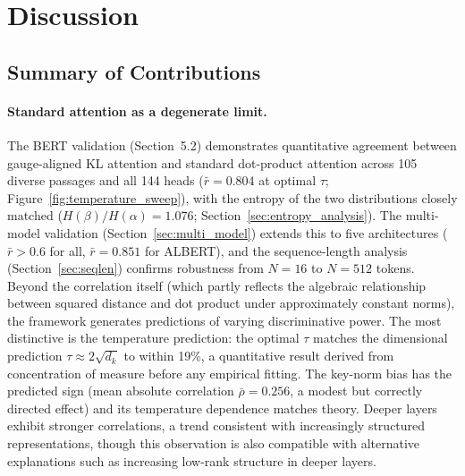 \documentclass[twoside,11pt]{article}
\begin{document}
\section{Discussion}

\subsection{Summary of Contributions}

\paragraph{Standard attention as a degenerate limit.} The BERT validation (Section~5.2) demonstrates quantitative agreement between gauge-aligned KL attention and standard dot-product attention across 105 diverse passages and all 144 heads ($\bar{r} = 0.804$ at optimal $\tau$; Figure~\ref{fig:temperature_sweep}), with the entropy of the two distributions closely matched ($H(\beta)/H(\alpha) = 1.076$; Section~\ref{sec:entropy_analysis}). The multi-model validation (Section~\ref{sec:multi_model}) extends this to five architectures ($\bar{r} > 0.6$ for all, $\bar{r} = 0.851$ for ALBERT), and the sequence-length analysis (Section~\ref{sec:seqlen}) confirms robustness from $N = 16$ to $N = 512$ tokens. Beyond the correlation itself (which partly reflects the algebraic relationship between squared distance and dot product under approximately constant norms), the framework generates predictions of varying discriminative power. The most distinctive is the temperature prediction: the optimal $\tau$ matches the dimensional prediction $\tau \approx 2\sqrt{d_k}$ to within 19\%, a quantitative result derived from concentration of measure before any empirical fitting. The key-norm bias has the predicted sign (mean absolute correlation $\bar{\rho} = 0.256$, a modest but correctly directed effect) and its temperature dependence matches theory. Deeper layers exhibit stronger correlations, a trend consistent with increasingly structured representations, though this observation is also compatible with alternative explanations such as increasing low-rank structure in deeper layers.
\end{document}
